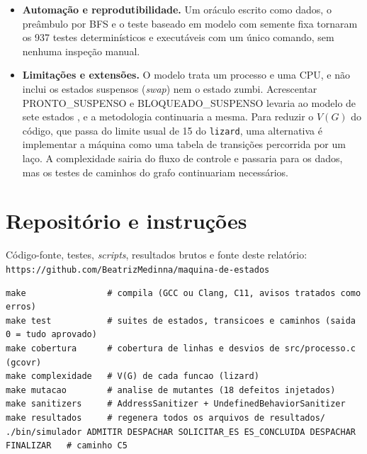 \documentclass[11pt,a4paper]{article}
\theoremstyle{definition}
\newcommand{\est}[1]{\textsf{\small #1}}   %
\newcommand{\VG}{V(G)}
\begin{document}
\begin{itemize}
        todas as transições junto com os pares não especificados foi o único critério que, sozinho,
        detectou todos os defeitos (18/18). Cobertura de 100\% das linhas e dos desvios não é a
        mesma coisa que eficácia: só a análise de mutantes mostrou que os testes realmente
        percebem erros.
  \item \textbf{Automação e reprodutibilidade.} Um oráculo escrito como dados, o preâmbulo por BFS
        e o teste baseado em modelo com semente fixa tornaram os 937 testes determinísticos e
        executáveis com um único comando, sem nenhuma inspeção manual.
  \item \textbf{Limitações e extensões.} O modelo trata um processo e uma CPU, e não inclui os
        estados suspensos (\emph{swap}) nem o estado zumbi. Acrescentar \est{PRONTO\_SUSPENSO} e
        \est{BLOQUEADO\_SUSPENSO} levaria ao modelo de sete estados \cite{silberschatz}, e a
        metodologia continuaria a mesma. Para reduzir o $\VG$ do código, que passa do limite usual
        de 15 do \texttt{lizard}, uma alternativa é implementar a máquina como uma tabela de
        transições percorrida por um laço. A complexidade sairia do fluxo de controle e passaria
        para os dados, mas os testes de caminhos do grafo continuariam necessários.
\end{itemize}

\section{Repositório e instruções}\label{sec:repo}

Código-fonte, testes, \emph{scripts}, resultados brutos e fonte deste relatório:\\
\texttt{https://github.com/BeatrizMedinna/maquina-de-estados}

\begin{lstlisting}[style=saida,basicstyle=\ttfamily\footnotesize,caption={Compilação, testes e reprodução dos resultados.},label={lst:make}]
make                # compila (GCC ou Clang, C11, avisos tratados como erros)
make test           # suites de estados, transicoes e caminhos (saida 0 = tudo aprovado)
make cobertura      # cobertura de linhas e desvios de src/processo.c (gcovr)
make complexidade   # V(G) de cada funcao (lizard)
make mutacao        # analise de mutantes (18 defeitos injetados)
make sanitizers     # AddressSanitizer + UndefinedBehaviorSanitizer
make resultados     # regenera todos os arquivos de resultados/
./bin/simulador ADMITIR DESPACHAR SOLICITAR_ES ES_CONCLUIDA DESPACHAR FINALIZAR   # caminho C5
\end{lstlisting}
\end{document}
